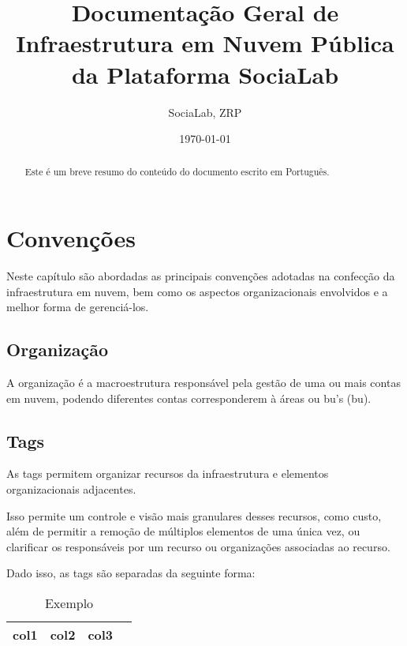 \documentclass[12pt, a4paper]{report}
\begin{document}
\title{Documentação Geral de Infraestrutura em Nuvem Pública da Plataforma SociaLab}
\author{SociaLab, ZRP}
\date{\today}

\maketitle{}
\tableofcontents{}

\printglossary[type=\acronymtype]

\printglossary{}


\printglossary[type=\acronymtype]

\begin{abstract}
	Este é um breve resumo do conteúdo do documento escrito em Português.
\end{abstract}

\chapter{Convenções}

Neste capítulo são abordadas as principais convenções adotadas na confecção da infraestrutura em nuvem, bem como os aspectos organizacionais envolvidos e a melhor forma de gerenciá-los.

\section{Organização}

A organização é a macroestrutura responsável pela gestão de uma ou mais contas em nuvem, podendo diferentes contas corresponderem à áreas ou \acrshort{bu}'s (\acrlong{bu}).

\section{Tags}

As tags permitem organizar recursos da infraestrutura e elementos organizacionais adjacentes.

Isso permite um controle e visão mais granulares desses recursos, como custo, além de permitir a remoção de múltiplos elementos de uma única vez, ou clarificar os responsáveis por um recurso ou organizações associadas ao recurso.

Dado isso, as tags são separadas da seguinte forma:

\begin{table}
	\begin{center}
		\begin{tabular}{ |c|c|c|c| }
			\hline
			col1 & col2 & col3 \\
			\hline
		\end{tabular}
	\end{center}
	\caption{Exemplo}
	\label{table:1}
\end{table}
\end{document}
